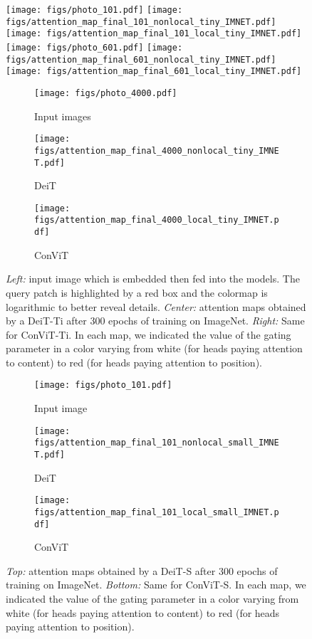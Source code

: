 \documentclass[a4paper,11pt,twocolumn]{article}
\begin{document}
\begin{figure*}[htb]
    \centering
    \texttt{[image: figs/photo\_101.pdf]}
    \texttt{[image: figs/attention\_map\_final\_101\_nonlocal\_tiny\_IMNET.pdf]}
    \hfill
    \texttt{[image: figs/attention\_map\_final\_101\_local\_tiny\_IMNET.pdf]}
    \texttt{[image: figs/photo\_601.pdf]}
    \texttt{[image: figs/attention\_map\_final\_601\_nonlocal\_tiny\_IMNET.pdf]}
    \hfill
    \texttt{[image: figs/attention\_map\_final\_601\_local\_tiny\_IMNET.pdf]}
    \begin{subfigure}[b]{.25\linewidth}
    \texttt{[image: figs/photo\_4000.pdf]}
    \caption{Input images}
    \end{subfigure}
    \begin{subfigure}[b]{.3\linewidth}
    \texttt{[image: figs/attention\_map\_final\_4000\_nonlocal\_tiny\_IMNET.pdf]}    
    \caption{DeiT}
    \end{subfigure}\hfill
    \begin{subfigure}[b]{.4\linewidth}
    \texttt{[image: figs/attention\_map\_final\_4000\_local\_tiny\_IMNET.pdf]}
    \caption{ConViT}
    \end{subfigure}    
    \caption{\textit{Left:} input image which is embedded then fed into the models. The query patch is highlighted by a red box and the colormap is logarithmic to better reveal details. \textit{Center:} attention maps obtained by a DeiT-Ti after 300 epochs of training on ImageNet. \textit{Right:} Same for ConViT-Ti. In each map, we indicated the value of the gating parameter in a color varying from white (for heads paying attention to content) to red (for heads paying attention to position). }
    \label{fig:maps-images}
\end{figure*}


\begin{figure*}[htb]
    \centering
    \begin{subfigure}[b]{.25\linewidth}
    \texttt{[image: figs/photo\_101.pdf]}
    \caption{Input image}
    \end{subfigure}
    \begin{subfigure}[b]{.7\linewidth}
    \texttt{[image: figs/attention\_map\_final\_101\_nonlocal\_small\_IMNET.pdf]}
    \caption{DeiT}
    \end{subfigure}
    \begin{subfigure}[b]{\linewidth}
    \texttt{[image: figs/attention\_map\_final\_101\_local\_small\_IMNET.pdf]}
    \caption{ConViT}
    \end{subfigure}
    \caption{\textit{Top:} attention maps obtained by a DeiT-S after 300 epochs of training on ImageNet. \textit{Bottom:} Same for ConViT-S. In each map, we indicated the value of the gating parameter in a color varying from white (for heads paying attention to content) to red (for heads paying attention to position). }
    \label{fig:maps-sizes}
\end{figure*}

\clearpage


 
\end{document}
